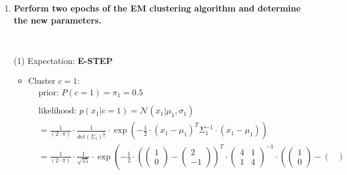 \documentclass[12pt]{article}
\begin{document}
\begin{enumerate}
    \item \textbf{Perform two epochs of the EM clustering algorithm and determine the new parameters.}
    
    \vspace{10pt}
    \colorbox{codeblue}{\textcolor{white}{FIRST EM EPOCH}}

    \vspace{10pt}
    (1) Expectation: \textbf{\textcolor{codeblue}{E-STEP}}
        
        \vspace{10pt}

        \vspace{10pt}
        \begin{itemize}[label=]
            \item Cluster $c=1$:
            \begin{equation*}
                \begin{aligned}
                    &\text{prior: } P(c=1) = \pi_1 = \mathbf{0.5} \\
                    \\
                    &\text{likelihood: } p(x_1|c=1) = \mathcal{N}(x_1| \mu_1, \sigma_1) \\
                    &= \frac{1}{(2 \cdot \pi)} \cdot \frac{1}{det(\Sigma_1)^{\frac{1}{2}}} \cdot \exp \left( -\frac{1}{2} \cdot (x_1 - \mu_1)^{T} \Sigma_1^{-1} \cdot (x_1 - \mu_1) \right)\\
                    &= \frac{1}{(2 \cdot \pi)} \cdot \frac{1}{\sqrt{15}} \cdot \exp \left( -\frac{1}{2} \cdot \left(\begin{pmatrix}
                    1\\
                    0
                    \end{pmatrix} - \begin{pmatrix}
                    2\\
                    -1
                    \end{pmatrix}\right)^{T} \cdot \begin{pmatrix}
                    4 & 1\\
                    1 & 4
                    \end{pmatrix}^{-1} \cdot \left(\begin{pmatrix}
                    1\\
                    0
                    \end{pmatrix} - \begin{pmatrix}

\end{pmatrix}
\end{aligned}
\end{equation*}
\end{itemize}
\end{enumerate}
\end{document}
